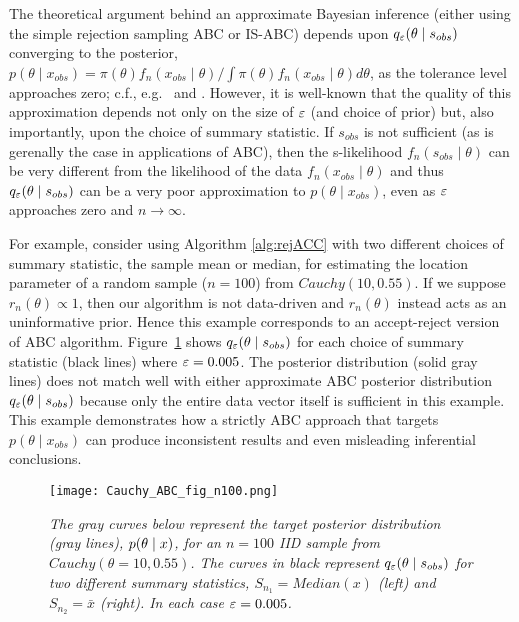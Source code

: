 \noindent
\hrulefill


The theoretical argument behind an approximate Bayesian inference (either using the simple rejection sampling ABC or IS-ABC) depends upon $q_{\varepsilon}(\theta\mid s_{\relax obs})$ converging to the posterior, $p(\theta \mid x_{obs}) = {\pi(\theta) f_n ( x_{obs} \mid\theta)}\big/{\int \pi(\theta) f_n ( x_{obs} \mid\theta)
d \theta }$, as the tolerance level approaches zero; c.f., e.g.~\cite{Marin2011} and \cite{Beaumont2019}. However, it is well-known that the quality of this approximation depends not only on the size of $\varepsilon$ (and choice of prior) but, also importantly, upon the choice of summary statistic. If $s_{obs}$ is not sufficient (as is gerenally the case in applications of ABC), then the s-likelihood $f_n (s_{obs} \mid\theta)$ can be very different from the likelihood of the data $f_n ( x_{obs} \mid\theta)$ and thus $q_{\varepsilon}(\theta\mid s_{\relax obs})$ can be a very poor approximation to $p(\theta\mid x_{obs})$, even as $\varepsilon$ approaches zero and $n \rightarrow \infty$.

For example, consider using Algorithm \ref{alg:rejACC} with two different choices of summary statistic, the sample mean or median, for estimating the location parameter of a random sample ($n=100$) from $Cauchy(10, 0.55)$. If we suppose $r_n(\theta) \propto 1$, then our algorithm is not data-driven and $r_n(\theta)$ instead acts as an uninformative prior. Hence this example corresponds to an accept-reject version of ABC algorithm. 
Figure~\ref{fig:ACC} shows $q_{\varepsilon}(\theta\mid s_{\relax obs})$ for each choice of summary statistic (black lines) where $\varepsilon = 0.005$. 
The posterior distribution (solid gray lines) does not match well with either approximate ABC posterior distribution $q_{\varepsilon}(\theta\mid s_{\relax obs})$ because only the entire data vector itself is sufficient in this example. This example demonstrates how a strictly ABC approach that targets $p(\theta \mid x_{obs})$ can produce inconsistent results and even misleading inferential conclusions.

\begin{figure}
\centering
\caption{{\it The gray curves below represent the target posterior distribution (gray lines), $p(\theta \mid {}{x})$, for an $n=100$ IID sample from $Cauchy(\theta=10,0.55)$. The curves in black represent  $q_{\varepsilon}(\theta \mid s_{obs})$ for two different summary statistics, $S_{n_1} = Median(x)$ (left) and $S_{n_2} = \bar{x}$ (right). In each case $\varepsilon = 0.005$.} }\label{fig:ACC}
\texttt{[image: Cauchy\_ABC\_fig\_n100.png]}
\end{figure}	


